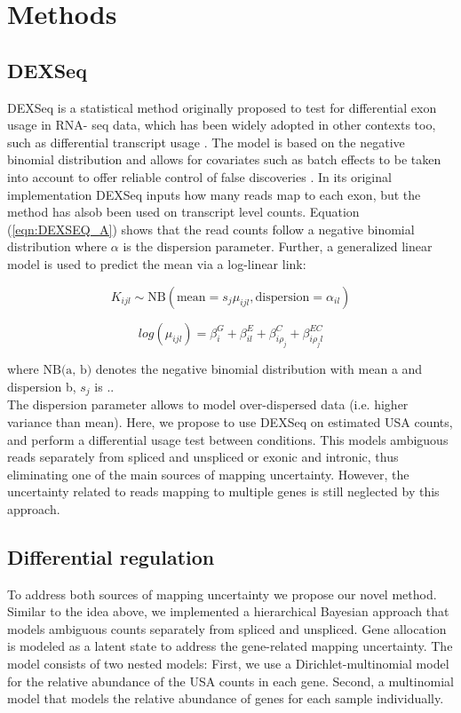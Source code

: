 

\chapter{Methods} 

\section{DEXSeq}
DEXSeq \citep{dexseq} is a statistical method originally proposed to test for differential exon usage in RNA- seq data, which has been widely adopted in other contexts too, such as differential transcript usage \citep{swimming_downstream}. The model is based on the negative binomial distribution and allows for covariates such as batch effects to be taken into account to offer reliable control of false discoveries \citep{dexseq}. In its original implementation DEXSeq inputs how many reads map to each exon, but the method has alsob been used on transcript level counts. Equation (\ref{eqn:DEXSEQ_A}) shows that the read counts follow a negative binomial distribution where $\alpha$ is the dispersion parameter. Further, a generalized linear model is used to predict the mean via a log-linear link:

\begin{equation}
K_{ijl} \sim \text{NB}(\text{mean}=s_j \mu_{ijl}, \text{dispersion}=\alpha_{il})
\label{eqn:DEXSEQ_A}
\end{equation}

\begin{equation}
log(\mu_{ijl}) = \beta^G_i + \beta^E_{il} + \beta_{i \rho_j}^C + \beta^{EC}_{i \rho_j l}
\label{eqn:DEXSEQ_B}
\end{equation}

where $\text{NB(a, b)}$ denotes the negative binomial distribution with mean a and dispersion b, $s_j$ is .. \\

The dispersion parameter allows to model over-dispersed data (i.e. higher variance than mean). Here, we propose to use DEXSeq on estimated USA counts, and perform a differential usage test between conditions. This models ambiguous reads separately from spliced and unspliced or exonic and intronic, thus eliminating one of the main sources of mapping uncertainty. However, the uncertainty related to reads mapping to multiple genes is still neglected by this approach. 

\section{Differential regulation}
To address both sources of mapping uncertainty we propose our novel method. Similar to the idea above, we implemented a hierarchical Bayesian approach that models ambiguous counts separately from spliced and unspliced. Gene allocation is modeled as a latent state to address the gene-related mapping uncertainty. The model consists of two nested models: First, we use a Dirichlet-multinomial model for the relative abundance of the USA counts in each gene. Second, a multinomial model that models the relative abundance of genes for each sample individually.

